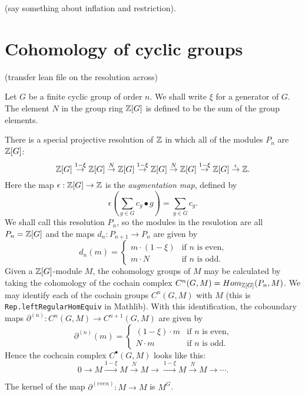 (say something about inflation and restriction).





\section{Cohomology of cyclic groups}

(transfer lean file on the resolution across)

Let $G$ be a finite cyclic group of order $n$. We shall write $\xi$ for a generator of $G$.
The element $N$ in the group ring ${\mathbb Z}[G]$ is defined to be the sum of the group elements.

There is a special projective resolution of ${\mathbb Z}$ in which all of the modules $P_n$ are ${\mathbb Z}[G]$:
\[
  {\mathbb Z}[G] \stackrel{1-\xi} \to {\mathbb Z}[G] \stackrel{N}\to {\mathbb Z}[G] \stackrel{1-\xi}
  \to {\mathbb Z}[G] \stackrel{N}\to {\mathbb Z}[G] \stackrel{1-\xi} \to {\mathbb Z}[G] \stackrel{\epsilon}\to {\mathbb Z}.
\]
Here the map $\epsilon : {\mathbb Z}[G] \to {\mathbb Z}$ is the \emph{augmentation map}, defined by
\[
  \epsilon \left(\sum_{g \in G} c_g \bullet g\right) = \sum_{g \in G} c_g.
\]
We shall call this resolution $P_n$, so the modules in the resulotion are all $P_n = {\mathbb Z}[G]$
and the maps $d_n : P_{n+1} \to P_n$ are given by
\[
  d_n(m) = \begin{cases}
    m \cdot (1-\xi) & \text{if $n$ is even,}\\
    m \cdot N & \text{if $n$ is odd.}
  \end{cases}
\]
Given a ${\mathbb Z}[G]$-module $M$, the cohomology groups of $M$ may be calculated by
taking the cohomology of the cochain complex $C^n(G,M) = Hom_{{\mathbb Z}[G]}(P_n,M)$.
We may identify each of the cochain groups $C^n(G,M)$ with $M$
(this is \texttt{Rep.leftRegularHomEquiv} in Mathlib).
With this identification, the coboundary maps $\partial^{(n)} : C^n(G,M) \to C^{n+1}(G,M)$
are given by
\[
  \partial^{(n)} (m) = \begin{cases}
    (1-\xi) \cdot m & \text{if $n$ is even,}\\
    N \cdot m & \text{if $n$ is odd.}
  \end{cases}
\]
Hence the cochcain complex $C^\bullet(G,M)$ looks like this:
\[
  0 \to M \stackrel{1-\xi}\to M \stackrel{N} \to M \to
    \stackrel{1-\xi}\to M \stackrel{N} \to M \to \cdots.
\]

\begin{lemma}
  The kernel of the map $\partial^{(even)}: M \to M$
  is $M^G$.
\end{lemma}

